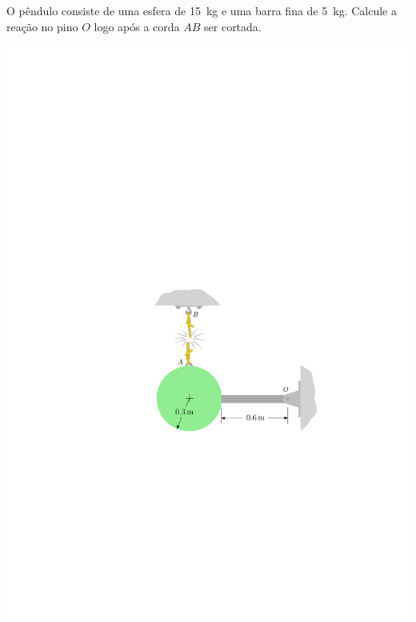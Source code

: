 \item O pêndulo consiste de uma esfera de \SI{15}{\kilogram} e uma barra fina de \SI{5}{\kilogram}. Calcule a reação no pino $O$ logo após a corda $AB$ ser cortada.

\vspace{-.4cm}
\begin{flushright}
	\includegraphics[scale=1.1]{../../images/draw_7}
\end{flushright}